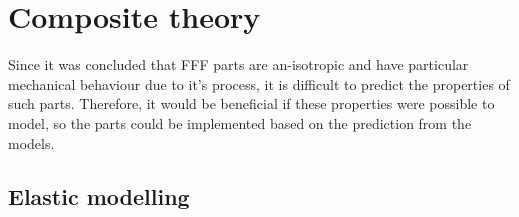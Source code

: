 



\section{Composite theory}
    \label{Modelling of FFF parts}
Since it was concluded that FFF parts are an-isotropic and have particular mechanical behaviour due to it's process, it is difficult to predict the properties of such parts. Therefore, it would be beneficial if these properties were possible to model, so the parts could be implemented based on the prediction from the models. 

\subsection{Elastic modelling}
